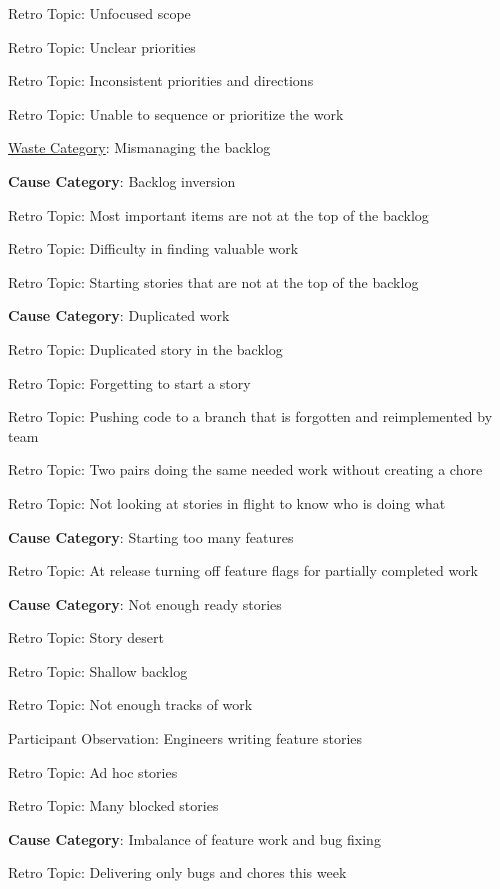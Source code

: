 \quad \quad \quad Retro Topic: Unfocused scope

\quad \quad \quad Retro Topic: Unclear priorities

\quad \quad \quad Retro Topic: Inconsistent priorities and directions

\quad \quad \quad Retro Topic: Unable to sequence or prioritize the work


\underline{Waste Category}: Mismanaging the backlog

\quad \textbf{Cause Category}: Backlog inversion

\quad \quad Retro Topic: Most important items are not at the top of the backlog

\quad \quad Retro Topic: Difficulty in finding valuable work

\quad \quad Retro Topic: Starting stories that are not at the top of the backlog

\quad \textbf{Cause Category}: Duplicated work

\quad \quad Retro Topic: Duplicated story in the backlog

\quad \quad Retro Topic: Forgetting to start a story

\quad \quad Retro Topic: Pushing code to a branch that is forgotten and reimplemented by team

\quad \quad Retro Topic: Two pairs doing the same needed work without creating a chore

\quad \quad Retro Topic: Not looking at stories in flight to know who is doing what

\quad \textbf{Cause Category}: Starting too many features

\quad \quad Retro Topic: At release turning off feature flags for partially completed work

\quad \textbf{Cause Category}: Not enough ready stories

\quad \quad Retro Topic: Story desert

\quad \quad Retro Topic: Shallow backlog

\quad \quad Retro Topic: Not enough tracks of work

\quad \quad Participant Observation: Engineers writing feature stories

\quad \quad Retro Topic: Ad hoc stories

\quad \quad Retro Topic: Many blocked stories

\quad \textbf{Cause Category}: Imbalance of feature work and bug fixing

\quad \quad Retro Topic: Delivering only bugs and chores this week

